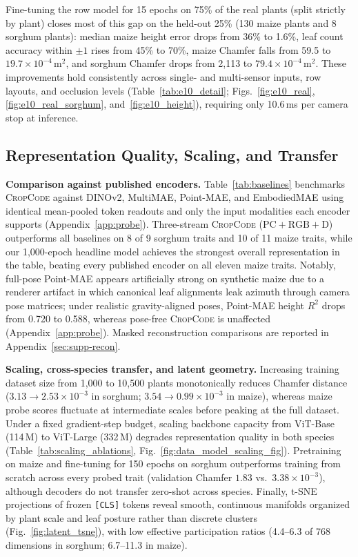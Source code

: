 \documentclass[10pt,twocolumn,letterpaper]{article}
\newcommand{\method}{\textsc{CropCode}}
\begin{document}
Fine-tuning the row model for 15 epochs on 75\% of the real plants (split strictly by plant) closes most of this gap on the held-out 25\% (130 maize plants and 8 sorghum plants): median maize height error drops from 36\% to 1.6\%, leaf count accuracy within $\pm 1$ rises from 45\% to 70\%, maize Chamfer falls from 59.5 to $19.7 \times 10^{-4}\,\mathrm{m}^2$, and sorghum Chamfer drops from 2{,}113 to $79.4 \times 10^{-4}\,\mathrm{m}^2$. These improvements hold consistently across single- and multi-sensor inputs, row layouts, and occlusion levels (Table~\ref{tab:e10_detail}; Figs.~\ref{fig:e10_real}, \ref{fig:e10_real_sorghum}, and~\ref{fig:e10_height}), requiring only 10.6\,ms per camera stop at inference.

\subsection{Representation Quality, Scaling, and Transfer}
\label{sec:res-repr}\label{sec:exp-repr}

\noindent\textbf{Comparison against published encoders.}
Table~\ref{tab:baselines} benchmarks \method{} against DINOv2, MultiMAE, Point-MAE, and EmbodiedMAE using identical mean-pooled token readouts and only the input modalities each encoder supports (Appendix~\ref{app:probe}). Three-stream \method{} ($\mathrm{PC}+\mathrm{RGB}+\mathrm{D}$) outperforms all baselines on 8 of 9 sorghum traits and 10 of 11 maize traits, while our 1{,}000-epoch headline model achieves the strongest overall representation in the table, beating every published encoder on all eleven maize traits. Notably, full-pose Point-MAE appears artificially strong on synthetic maize due to a renderer artifact in which canonical leaf alignments leak azimuth through camera pose matrices; under realistic gravity-aligned poses, Point-MAE height $R^2$ drops from 0.720 to 0.588, whereas pose-free \method{} is unaffected (Appendix~\ref{app:probe}). Masked reconstruction comparisons are reported in Appendix~\ref{sec:supp-recon}.

\noindent\textbf{Scaling, cross-species transfer, and latent geometry.}
Increasing training dataset size from 1{,}000 to 10{,}500 plants monotonically reduces Chamfer distance ($3.13 \to 2.53 \times 10^{-3}$ in sorghum; $3.54 \to 0.99 \times 10^{-3}$ in maize), whereas maize probe scores fluctuate at intermediate scales before peaking at the full dataset. Under a fixed gradient-step budget, scaling backbone capacity from ViT-Base (114\,M) to ViT-Large (332\,M) degrades representation quality in both species (Table~\ref{tab:scaling_ablations}, Fig.~\ref{fig:data_model_scaling_fig}). Pretraining on maize and fine-tuning for 150 epochs on sorghum outperforms training from scratch across every probed trait (validation Chamfer $1.83$ vs.\ $3.38 \times 10^{-3}$), although decoders do not transfer zero-shot across species. Finally, t-SNE projections of frozen \texttt{[CLS]} tokens reveal smooth, continuous manifolds organized by plant scale and leaf posture rather than discrete clusters (Fig.~\ref{fig:latent_tsne}), with low effective participation ratios (4.4--6.3 of 768 dimensions in sorghum; 6.7--11.3 in maize).
\end{document}
